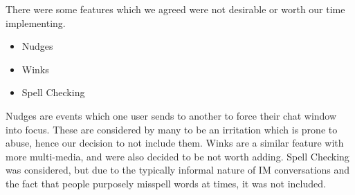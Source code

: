 There were some features which we agreed were not desirable or worth our time implementing.

\begin{itemize}

\item{Nudges}
\item{Winks}
\item{Spell Checking}

\end{itemize}

Nudges are events which one user sends to another to force their chat window into focus. These are considered by many to be an irritation which is prone to abuse, hence our decision to not include them. Winks are a similar feature with more multi-media, and were also decided to be not worth adding. Spell Checking was considered, but due to the typically informal nature of IM conversations and the fact that people purposely misspell words at times, it was not included.

